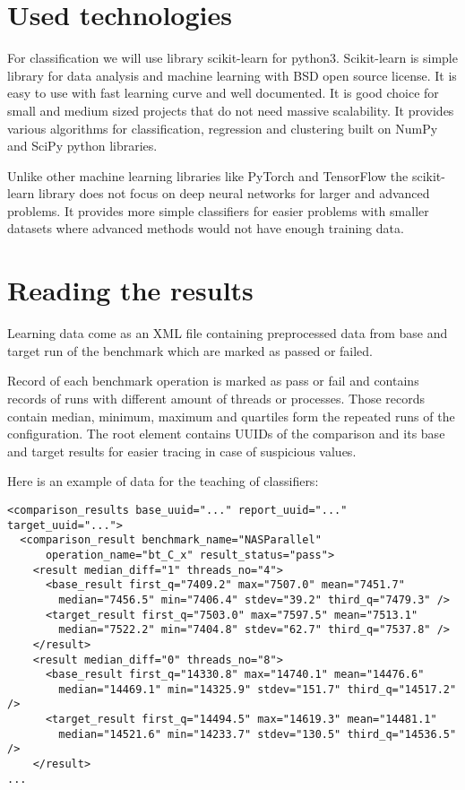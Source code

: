 \section{Used technologies}
For classification we will use library scikit-learn for python3. Scikit-learn is
simple library for data analysis and machine learning with BSD open source
license. It is easy to use with fast learning curve and well documented. It is
good choice for small and medium sized projects that do not need massive
scalability. It provides various algorithms for classification, regression and
clustering built on NumPy and SciPy python libraries.

Unlike other machine learning libraries like PyTorch and TensorFlow the
scikit-learn library does not focus on deep neural networks for larger and
advanced problems. It provides more simple classifiers for easier problems
with smaller datasets where advanced methods would not have enough training
data.

\section{Reading the results}
Learning data come as an XML file containing preprocessed data from
base and target run of the benchmark which are marked as passed or failed.

Record of each benchmark operation is marked as pass or fail and contains
records of runs with different amount of threads or processes. Those records
contain median, minimum, maximum and quartiles form the repeated runs of the
configuration. The root element contains UUIDs of the comparison and its base
and target results for easier tracing in case of suspicious values.

Here is an example of data for the teaching of classifiers:
\begin{verbatim}
<comparison_results base_uuid="..." report_uuid="..." target_uuid="...">
  <comparison_result benchmark_name="NASParallel"
      operation_name="bt_C_x" result_status="pass">
    <result median_diff="1" threads_no="4">
      <base_result first_q="7409.2" max="7507.0" mean="7451.7"
        median="7456.5" min="7406.4" stdev="39.2" third_q="7479.3" />
      <target_result first_q="7503.0" max="7597.5" mean="7513.1"
        median="7522.2" min="7404.8" stdev="62.7" third_q="7537.8" />
    </result>
    <result median_diff="0" threads_no="8">
      <base_result first_q="14330.8" max="14740.1" mean="14476.6"
        median="14469.1" min="14325.9" stdev="151.7" third_q="14517.2" />
      <target_result first_q="14494.5" max="14619.3" mean="14481.1"
        median="14521.6" min="14233.7" stdev="130.5" third_q="14536.5" />
    </result>
...
\end{verbatim}

